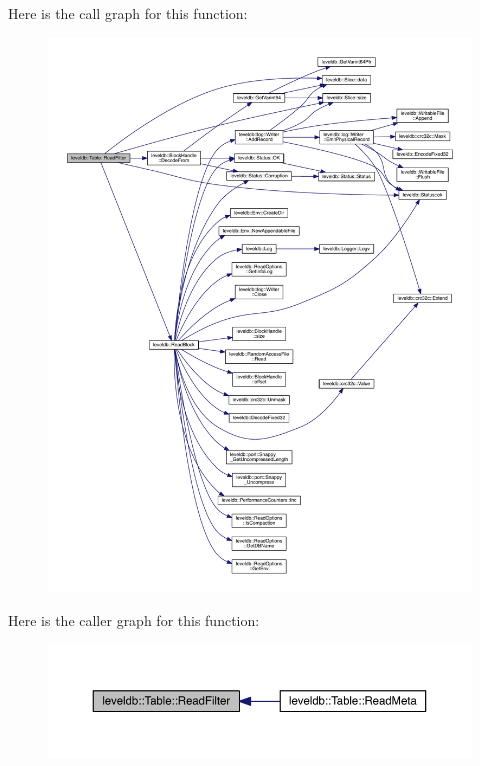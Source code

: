 Here is the call graph for this function\+:\nopagebreak
\begin{figure}[H]
\begin{center}
\leavevmode
\includegraphics[width=350pt]{classleveldb_1_1_table_a10d0ee696719be3f9f66506751656175_cgraph}
\end{center}
\end{figure}




Here is the caller graph for this function\+:\nopagebreak
\begin{figure}[H]
\begin{center}
\leavevmode
\includegraphics[width=350pt]{classleveldb_1_1_table_a10d0ee696719be3f9f66506751656175_icgraph}
\end{center}
\end{figure}


